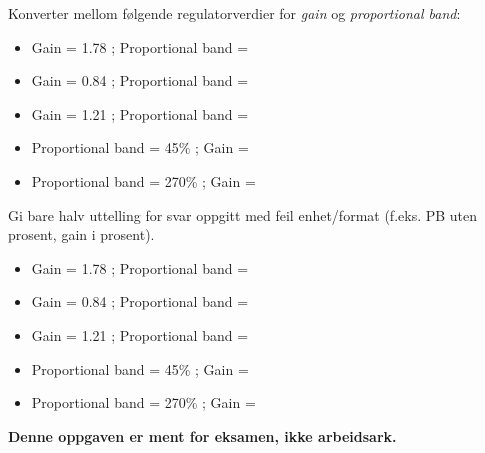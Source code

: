 

Konverter mellom følgende regulatorverdier for {\it gain} og {\it proportional band}:

\vskip 10pt

\begin{itemize}
\item{} Gain = 1.78 ; Proportional band = \underbar{\hskip 50pt}
\vskip 5pt
\item{} Gain = 0.84 ; Proportional band = \underbar{\hskip 50pt}
\vskip 5pt
\item{} Gain = 1.21 ; Proportional band = \underbar{\hskip 50pt}
\vskip 5pt
\item{} Proportional band = 45\% ; Gain = \underbar{\hskip 50pt}
\vskip 5pt
\item{} Proportional band = 270\% ; Gain = \underbar{\hskip 50pt}
\end{itemize}







Gi bare halv uttelling for svar oppgitt med feil enhet/format (f.eks. PB uten prosent, gain i prosent).

\begin{itemize}
\item{} Gain = 1.78 ; Proportional band = 
\item{} Gain = 0.84 ; Proportional band = 
\item{} Gain = 1.21 ; Proportional band = 
\item{} Proportional band = 45\% ; Gain = 
\item{} Proportional band = 270\% ; Gain = 
\end{itemize}







{\bf Denne oppgaven er ment for eksamen, ikke arbeidsark.}

